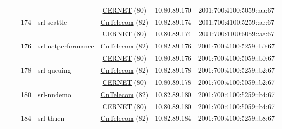 \begin{small}
\begin{center}
\begin{longtable}{|c|c|c|c|c|c|c|c|}
  &  &  &  & \multicolumn{2}{|c|}{\tiny{\href{http://www.cernet.edu.cn}{CERNET} (80)}} & \tiny{10.80.89.170} & \tiny{2001:700:4100:5059::aa:67} \\* \cline{3-3}\cline{4-4}\cline{5-5}\cline{6-6}\cline{7-7}\cline{8-8}
  &  & \multirow{2}{*}{\tiny{174}} & \multicolumn{1}{|l|}{\multirow{2}{*}{\tiny{srl-seattle}}} & \multicolumn{2}{|c|}{\tiny{\href{http://www.chinatelecom.com.cn}{CnTelecom} (82)}} & \tiny{10.82.89.174} & \tiny{2001:700:4100:5259::ae:67} \\* \cline{5-5}\cline{6-6}\cline{7-7}\cline{8-8}
  &  &  &  & \multicolumn{2}{|c|}{\tiny{\href{http://www.cernet.edu.cn}{CERNET} (80)}} & \tiny{10.80.89.174} & \tiny{2001:700:4100:5059::ae:67} \\* \cline{3-3}\cline{4-4}\cline{5-5}\cline{6-6}\cline{7-7}\cline{8-8}
  &  & \multirow{2}{*}{\tiny{176}} & \multicolumn{1}{|l|}{\multirow{2}{*}{\tiny{srl-netperformance}}} & \multicolumn{2}{|c|}{\tiny{\href{http://www.chinatelecom.com.cn}{CnTelecom} (82)}} & \tiny{10.82.89.176} & \tiny{2001:700:4100:5259::b0:67} \\* \cline{5-5}\cline{6-6}\cline{7-7}\cline{8-8}
  &  &  &  & \multicolumn{2}{|c|}{\tiny{\href{http://www.cernet.edu.cn}{CERNET} (80)}} & \tiny{10.80.89.176} & \tiny{2001:700:4100:5059::b0:67} \\* \cline{3-3}\cline{4-4}\cline{5-5}\cline{6-6}\cline{7-7}\cline{8-8}
  &  & \multirow{2}{*}{\tiny{178}} & \multicolumn{1}{|l|}{\multirow{2}{*}{\tiny{srl-queuing}}} & \multicolumn{2}{|c|}{\tiny{\href{http://www.chinatelecom.com.cn}{CnTelecom} (82)}} & \tiny{10.82.89.178} & \tiny{2001:700:4100:5259::b2:67} \\* \cline{5-5}\cline{6-6}\cline{7-7}\cline{8-8}
  &  &  &  & \multicolumn{2}{|c|}{\tiny{\href{http://www.cernet.edu.cn}{CERNET} (80)}} & \tiny{10.80.89.178} & \tiny{2001:700:4100:5059::b2:67} \\* \cline{3-3}\cline{4-4}\cline{5-5}\cline{6-6}\cline{7-7}\cline{8-8}
  &  & \multirow{2}{*}{\tiny{180}} & \multicolumn{1}{|l|}{\multirow{2}{*}{\tiny{srl-nndemo}}} & \multicolumn{2}{|c|}{\tiny{\href{http://www.chinatelecom.com.cn}{CnTelecom} (82)}} & \tiny{10.82.89.180} & \tiny{2001:700:4100:5259::b4:67} \\* \cline{5-5}\cline{6-6}\cline{7-7}\cline{8-8}
  &  &  &  & \multicolumn{2}{|c|}{\tiny{\href{http://www.cernet.edu.cn}{CERNET} (80)}} & \tiny{10.80.89.180} & \tiny{2001:700:4100:5059::b4:67} \\* \cline{3-3}\cline{4-4}\cline{5-5}\cline{6-6}\cline{7-7}\cline{8-8}
  &  & \multirow{2}{*}{\tiny{184}} & \multicolumn{1}{|l|}{\multirow{2}{*}{\tiny{srl-thuen}}} & \multicolumn{2}{|c|}{\tiny{\href{http://www.chinatelecom.com.cn}{CnTelecom} (82)}} & \tiny{10.82.89.184} & \tiny{2001:700:4100:5259::b8:67} \\* \cline{5-5}\cline{6-6}\cline{7-7}\cline{8-8}

\end{longtable}
\end{center}
\end{small}
